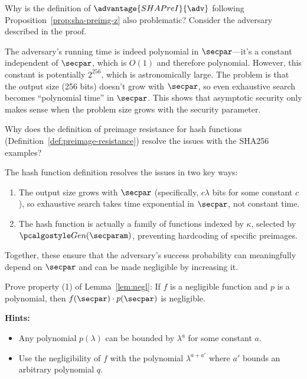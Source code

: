 \begin{exercise}\label{ex:sha-random-preimage-problem}
  Why is the definition of $\advantage{SHAPreI}{\adv}$ following Proposition~\ref{prop:sha-preimg-z} also problematic?
  Consider the adversary described in the proof.
\end{exercise}

\ifsolutions
\begin{mysolution}
  The adversary's running time is indeed polynomial in $\secpar$—it's a constant independent of $\secpar$, which is $O(1)$ and therefore polynomial.
  However, this constant is potentially $2^{256}$, which is astronomically large.
  The problem is that the output size (256 bits) doesn't grow with $\secpar$, so even exhaustive search becomes ``polynomial time'' in $\secpar$.
  This shows that asymptotic security only makes sense when the problem size grows with the security parameter.
\end{mysolution}
\fi

\begin{exercise}\label{ex:hash-function-definition}
  Why does the definition of preimage resistance for hash functions (Definition~\ref{def:preimage-resistance}) resolve the issues with the SHA256 examples?
\end{exercise}

\ifsolutions
\begin{mysolution}
  The hash function definition resolves the issues in two key ways:
  \begin{enumerate}
    \item The output size grows with $\secpar$ (specifically, $c\lambda$ bits for some constant $c$), so exhaustive search takes time exponential in $\secpar$, not constant time.
    \item The hash function is actually a family of functions indexed by $\kappa$, selected by $\algo{Gen}(\secparam)$, preventing hardcoding of specific preimages.
  \end{enumerate}
  Together, these ensure that the adversary's success probability can meaningfully depend on $\secpar$ and can be made negligible by increasing it.
\end{mysolution}
\fi

\begin{exercise}[Optional]\label{ex:negl-property-proof}
  Prove property (1) of Lemma~\ref{lem:negl}: If $f$ is a negligible function and $p$ is a polynomial, then $f(\secpar) \cdot p(\secpar)$ is negligible.
  
  \textbf{Hints:}
  \begin{itemize}
    \item Any polynomial $p(\lambda)$ can be bounded by $\lambda^{a}$ for some constant $a$.
    \item Use the negligibility of $f$ with the polynomial $\lambda^{a + a'}$ where $a'$ bounds an arbitrary polynomial $q$.
  \end{itemize}
\end{exercise}


